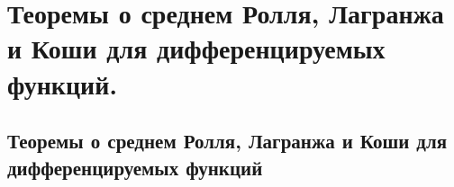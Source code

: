 \chapter{Теоремы о среднем Ролля, Лагранжа и Коши для дифференцируемых функций.}
\section{Теоремы о среднем Ролля, Лагранжа и Коши для дифференцируемых функций}
